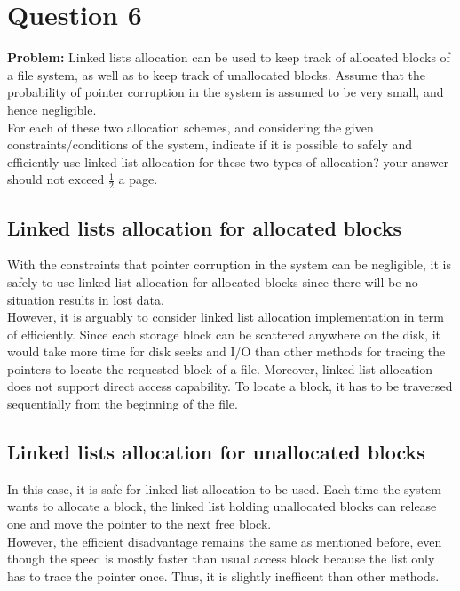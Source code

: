 \newpage
\section{Question 6}
\textbf{Problem:}
Linked lists allocation can be used to keep track of allocated blocks of a file system, as well as to
keep track of unallocated blocks. Assume that the probability of pointer corruption in the system
is assumed to be very small, and hence negligible. \\
For each of these two allocation schemes, and considering the given constraints/conditions of the
system, indicate if it is possible to safely and efficiently use linked-list allocation for these two
types of allocation? your answer should not exceed $\frac{1}{2}$ a page.

\subsection{Linked lists allocation for allocated blocks}
With the constraints that pointer corruption in the system can be negligible, it is safely to use linked-list allocation for allocated blocks since there will be no situation results in lost data. \\
However, it is arguably to consider linked list allocation implementation in term of efficiently. Since each storage block can be scattered anywhere on the disk, it would take more time for disk seeks and I/O than other methods for tracing the pointers to locate the requested block of a file. 
Moreover, linked-list allocation does not support direct access capability. To locate a block, it has to be traversed sequentially from the beginning of the file. \\

\subsection{Linked lists allocation for unallocated blocks}
In this case, it is safe for linked-list allocation to be used. Each time the system wants to allocate a block, the linked list holding unallocated blocks can release one and move the pointer to the next free block. \\
However, the efficient disadvantage remains the same as mentioned before, even though the speed is mostly faster than usual access block because the list only has to trace the pointer once. Thus, it is slightly inefficent than other methods.


